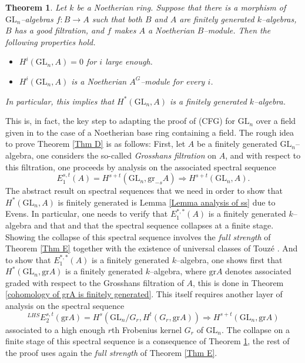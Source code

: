 \documentclass{article}
\theoremstyle{plain}
\newtheorem{thmx}{Theorem}
\theoremstyle{definition}
\newcommand{\GL}{\mathrm{GL}}
\begin{document}
\begin{thmx}\label{Thm F}
    Let $k$ be a Noetherian ring.  Suppose that there is a morphism of $\GL_n$--algebras $f\colon B\to A$ such that both $B$ and $A$ are  finitely generated $k$--algebras,
         $B$ has a good filtration, and
         $f$ makes $A$ a Noetherian $B$--module.
     Then the following properties hold.
\begin{itemize}
    \item[$(a)$] $H^i(\GL_n,A)=0$ for $i$ large enough. 
    \item[$(b)$] $H^i(\GL_n,A)$ is a Noetherian $A^G$--module for every $i$.
\end{itemize}
In particular, this implies that $H^\ast(\GL_n,A)$ is a finitely generated $k$--algebra.
\end{thmx}








This is, in fact, the key step to adapting the proof of (CFG) for $\GL_n$ over a field given in \cite{TvdK10} to the case of a Noetherian base ring containing a field. The rough idea to prove Theorem \ref{Thm D} is as follows: First, let $A$ be a finitely generated $\GL_n$--algebra, one considers the so-called \textit{Grosshans filtration} on $A$, and with respect to this filtration, one proceeds by analysis on the associated spectral sequence 
\[
E_1^{s,t}(A)=H^{s+t}(\GL_n,\mathrm{gr}_{-s}A)\Rightarrow H^{s+t}(\GL_n,A).
\]
The abstract result on spectral sequences that we need in order to show that $H^\ast(\GL_n,A)$ is finitely generated is Lemma \ref{Lemma analysis of ss} due to Evens. In particular, one needs to verify that  $E^{\ast,\ast}_1(A)$ is a finitely generated $k$--algebra and that and that the spectral sequence collapses at a finite stage. Showing the collapse of this spectral sequence involves the \textit{full strength} of Theorem \ref{Thm E} together with the existence of universal classes of Touz\'e \cite{Tou10}. And to show that $E^{\ast,\ast}_1(A)$ is a finitely generated $k$--algebra, one shows first that $H^\ast(\GL_n,\mathrm{gr}A)$  is a finitely generated $k$--algebra, where $\mathrm{gr}A$ denotes associated graded with respect to the Grosshans filtration of $A$, this is done in Theorem \ref{cohomology of grA is finitely generated}. This itself requires another layer of analysis on the spectral sequence 
\[
{}^{LHS}E^{s,t}_2(\mathrm{gr}A)=H^s(\GL_n/G_r,H^t(G_r,\mathrm{gr}A))\Rightarrow H^{s+t}(\GL_n,\mathrm{gr}A)
\] associated to a high enough $r$th Frobenius kernel $G_r$ of $\GL_n$. The collapse on a finite stage of this spectral sequence is a consequence of Theorem \ref{Thm F}, the rest of the proof uses again  the \textit{full strength} of Theorem \ref{Thm E}.  
\end{document}
